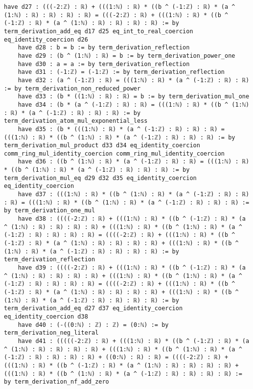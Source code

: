 \documentclass{article}
\begin{document}
\begin{tcolorbox}[colback=white!10, width=\linewidth]
\begin{lstlisting}[language=Lean4]
    have d27 : (((-2:ℤ) : ℝ) + (((1:ℕ) : ℝ) * ((b ^ (-1:ℤ) : ℝ) * (a ^ (1:ℕ) : ℝ) : ℝ) : ℝ) : ℝ) = (((-2:ℤ) : ℝ) + (((1:ℕ) : ℝ) * ((b ^ (-1:ℤ) : ℝ) * (a ^ (1:ℕ) : ℝ) : ℝ) : ℝ) : ℝ) := by term_derivation_add_eq d17 d25 eq_int_to_real_coercion eq_identity_coercion d26
    have d28 : b = b := by term_derivation_reflection
    have d29 : (b ^ (1:ℕ) : ℝ) = b := by term_derivation_power_one
    have d30 : a = a := by term_derivation_reflection
    have d31 : (-1:ℤ) = (-1:ℤ) := by term_derivation_reflection
    have d32 : (a ^ (-1:ℤ) : ℝ) = (((1:ℕ) : ℝ) * (a ^ (-1:ℤ) : ℝ) : ℝ) := by term_derivation_non_reduced_power
    have d33 : (b * ((1:ℕ) : ℝ) : ℝ) = b := by term_derivation_mul_one
    have d34 : (b * (a ^ (-1:ℤ) : ℝ) : ℝ) = (((1:ℕ) : ℝ) * ((b ^ (1:ℕ) : ℝ) * (a ^ (-1:ℤ) : ℝ) : ℝ) : ℝ) := by term_derivation_atom_mul_exponential_less
    have d35 : (b * (((1:ℕ) : ℝ) * (a ^ (-1:ℤ) : ℝ) : ℝ) : ℝ) = (((1:ℕ) : ℝ) * ((b ^ (1:ℕ) : ℝ) * (a ^ (-1:ℤ) : ℝ) : ℝ) : ℝ) := by term_derivation_mul_product d33 d34 eq_identity_coercion comm_ring_mul_identity_coercion comm_ring_mul_identity_coercion
    have d36 : ((b ^ (1:ℕ) : ℝ) * (a ^ (-1:ℤ) : ℝ) : ℝ) = (((1:ℕ) : ℝ) * ((b ^ (1:ℕ) : ℝ) * (a ^ (-1:ℤ) : ℝ) : ℝ) : ℝ) := by term_derivation_mul_eq d29 d32 d35 eq_identity_coercion eq_identity_coercion
    have d37 : (((1:ℕ) : ℝ) * ((b ^ (1:ℕ) : ℝ) * (a ^ (-1:ℤ) : ℝ) : ℝ) : ℝ) = (((1:ℕ) : ℝ) * ((b ^ (1:ℕ) : ℝ) * (a ^ (-1:ℤ) : ℝ) : ℝ) : ℝ) := by term_derivation_one_mul
    have d38 : ((((-2:ℤ) : ℝ) + (((1:ℕ) : ℝ) * ((b ^ (-1:ℤ) : ℝ) * (a ^ (1:ℕ) : ℝ) : ℝ) : ℝ) : ℝ) + (((1:ℕ) : ℝ) * ((b ^ (1:ℕ) : ℝ) * (a ^ (-1:ℤ) : ℝ) : ℝ) : ℝ) : ℝ) = ((((-2:ℤ) : ℝ) + (((1:ℕ) : ℝ) * ((b ^ (-1:ℤ) : ℝ) * (a ^ (1:ℕ) : ℝ) : ℝ) : ℝ) : ℝ) + (((1:ℕ) : ℝ) * ((b ^ (1:ℕ) : ℝ) * (a ^ (-1:ℤ) : ℝ) : ℝ) : ℝ) : ℝ) := by term_derivation_reflection
    have d39 : ((((-2:ℤ) : ℝ) + (((1:ℕ) : ℝ) * ((b ^ (-1:ℤ) : ℝ) * (a ^ (1:ℕ) : ℝ) : ℝ) : ℝ) : ℝ) + (((1:ℕ) : ℝ) * ((b ^ (1:ℕ) : ℝ) * (a ^ (-1:ℤ) : ℝ) : ℝ) : ℝ) : ℝ) = ((((-2:ℤ) : ℝ) + (((1:ℕ) : ℝ) * ((b ^ (-1:ℤ) : ℝ) * (a ^ (1:ℕ) : ℝ) : ℝ) : ℝ) : ℝ) + (((1:ℕ) : ℝ) * ((b ^ (1:ℕ) : ℝ) * (a ^ (-1:ℤ) : ℝ) : ℝ) : ℝ) : ℝ) := by term_derivation_add_eq d27 d37 eq_identity_coercion eq_identity_coercion d38
    have d40 : (-((0:ℕ) : ℤ) : ℤ) = (0:ℕ) := by term_derivation_neg_literal
    have d41 : (((((-2:ℤ) : ℝ) + (((1:ℕ) : ℝ) * ((b ^ (-1:ℤ) : ℝ) * (a ^ (1:ℕ) : ℝ) : ℝ) : ℝ) : ℝ) + (((1:ℕ) : ℝ) * ((b ^ (1:ℕ) : ℝ) * (a ^ (-1:ℤ) : ℝ) : ℝ) : ℝ) : ℝ) + ((0:ℕ) : ℝ) : ℝ) = ((((-2:ℤ) : ℝ) + (((1:ℕ) : ℝ) * ((b ^ (-1:ℤ) : ℝ) * (a ^ (1:ℕ) : ℝ) : ℝ) : ℝ) : ℝ) + (((1:ℕ) : ℝ) * ((b ^ (1:ℕ) : ℝ) * (a ^ (-1:ℤ) : ℝ) : ℝ) : ℝ) : ℝ) := by term_derivation_nf_add_zero

\end{lstlisting}
\end{tcolorbox}
\end{document}
